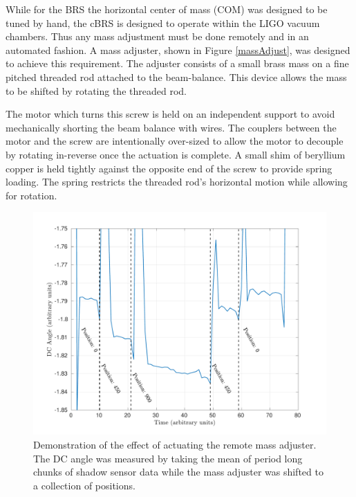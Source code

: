 \documentclass [12pt, proquest]{uwthesis}[2019]
\begin{document}
While for the BRS the horizontal center of mass (COM) was designed to be tuned by hand, the cBRS is designed to operate within the LIGO vacuum chambers. Thus any mass adjustment must be done remotely and in an automated fashion. A mass adjuster, shown in Figure \ref{massAdjust}, was designed to achieve this requirement. The adjuster consists of a small brass mass on a fine pitched threaded rod attached to the beam-balance. This device allows the mass to be shifted by rotating the threaded rod.

The motor which turns this screw is held on an independent support to avoid mechanically shorting the beam balance with wires. The couplers between the motor and the screw are intentionally over-sized to allow the motor to decouple by rotating in-reverse once the actuation is complete. A small shim of beryllium copper is held tightly against the opposite end of the screw to provide spring loading. The spring restricts the threaded rod's horizontal motion while allowing for rotation.

\begin{figure}[!h]
\begin{center}
\includegraphics[width=\textwidth]{cBRS_massAdjust.pdf}
\end{center}
\caption[Demonstration of the effect of actuating the remote mass adjuster]{Demonstration of the effect of actuating the remote mass adjuster. The DC angle was measured by taking the mean of period long chunks of shadow sensor data while the mass adjuster was shifted to a collection of positions.}\label{massAdjustPlot}
\end{figure}
\end{document}
